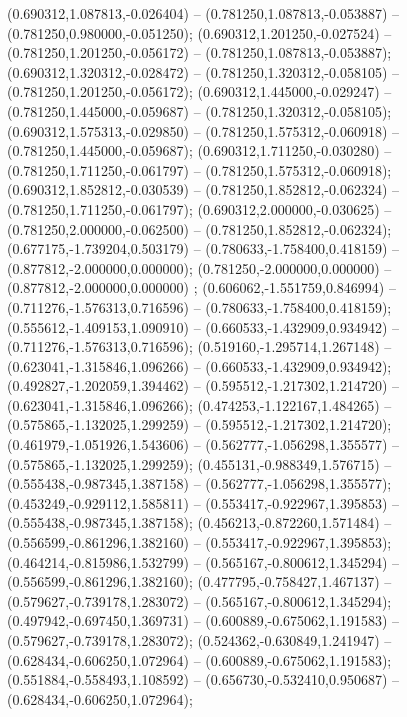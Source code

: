  (0.690312,1.087813,-0.026404) -- (0.781250,1.087813,-0.053887) -- (0.781250,0.980000,-0.051250);
 (0.690312,1.201250,-0.027524) -- (0.781250,1.201250,-0.056172) -- (0.781250,1.087813,-0.053887);
 (0.690312,1.320312,-0.028472) -- (0.781250,1.320312,-0.058105) -- (0.781250,1.201250,-0.056172);
 (0.690312,1.445000,-0.029247) -- (0.781250,1.445000,-0.059687) -- (0.781250,1.320312,-0.058105);
 (0.690312,1.575313,-0.029850) -- (0.781250,1.575312,-0.060918) -- (0.781250,1.445000,-0.059687);
 (0.690312,1.711250,-0.030280) -- (0.781250,1.711250,-0.061797) -- (0.781250,1.575312,-0.060918);
 (0.690312,1.852812,-0.030539) -- (0.781250,1.852812,-0.062324) -- (0.781250,1.711250,-0.061797);
 (0.690312,2.000000,-0.030625) -- (0.781250,2.000000,-0.062500) -- (0.781250,1.852812,-0.062324);
 (0.677175,-1.739204,0.503179) -- (0.780633,-1.758400,0.418159) -- (0.877812,-2.000000,0.000000);
 (0.781250,-2.000000,0.000000) -- (0.877812,-2.000000,0.000000) ;
 (0.606062,-1.551759,0.846994) -- (0.711276,-1.576313,0.716596) -- (0.780633,-1.758400,0.418159);
 (0.555612,-1.409153,1.090910) -- (0.660533,-1.432909,0.934942) -- (0.711276,-1.576313,0.716596);
 (0.519160,-1.295714,1.267148) -- (0.623041,-1.315846,1.096266) -- (0.660533,-1.432909,0.934942);
 (0.492827,-1.202059,1.394462) -- (0.595512,-1.217302,1.214720) -- (0.623041,-1.315846,1.096266);
 (0.474253,-1.122167,1.484265) -- (0.575865,-1.132025,1.299259) -- (0.595512,-1.217302,1.214720);
 (0.461979,-1.051926,1.543606) -- (0.562777,-1.056298,1.355577) -- (0.575865,-1.132025,1.299259);
 (0.455131,-0.988349,1.576715) -- (0.555438,-0.987345,1.387158) -- (0.562777,-1.056298,1.355577);
 (0.453249,-0.929112,1.585811) -- (0.553417,-0.922967,1.395853) -- (0.555438,-0.987345,1.387158);
 (0.456213,-0.872260,1.571484) -- (0.556599,-0.861296,1.382160) -- (0.553417,-0.922967,1.395853);
 (0.464214,-0.815986,1.532799) -- (0.565167,-0.800612,1.345294) -- (0.556599,-0.861296,1.382160);
 (0.477795,-0.758427,1.467137) -- (0.579627,-0.739178,1.283072) -- (0.565167,-0.800612,1.345294);
 (0.497942,-0.697450,1.369731) -- (0.600889,-0.675062,1.191583) -- (0.579627,-0.739178,1.283072);
 (0.524362,-0.630849,1.241947) -- (0.628434,-0.606250,1.072964) -- (0.600889,-0.675062,1.191583);
 (0.551884,-0.558493,1.108592) -- (0.656730,-0.532410,0.950687) -- (0.628434,-0.606250,1.072964);
